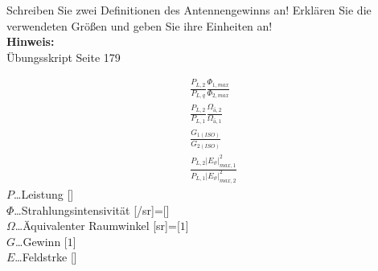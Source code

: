 \begin{question}[section=10,name={Antennengewinn 1},difficulty=,quantity=2,type=thr,tags={}]
	Schreiben Sie zwei Definitionen des Antennengewinns an! Erklären Sie
	die verwendeten Größen und geben Sie ihre Einheiten an! 
	\\ \textbf{Hinweis:}\\
	Übungsskript Seite 179
\end{question}
\begin{solution}
	\begin{align}
	&\frac{P_{L,2}}{P_{L,q}} \frac{\Phi_{1,max}}{\Phi_{2,max}}\\
	&\frac{P_{L,2}}{P_{L,1}} \frac{\Omega_{ä,2}}{\Omega_{ä,1}}\\
	&\frac{G_{1(ISO)}}{G_{2(ISO)}}\\
	&\frac{P_{L,2} |E_\vartheta|^2_{max,1}}{P_{L,1} |E_\vartheta|^2_{max,2}}
\end{align}
	$P$\dots Leistung [\watt]\\
	$\Phi$\dots Strahlungsintensivität [\watt/sr]=[\watt]\\
	$\Omega$\dots Äquivalenter Raumwinkel [sr]=[$1$]\\
	$G$\dots Gewinn [$1$]\\
	$E$\dots Feldstrke [\volt\per\meter]
\end{solution}
